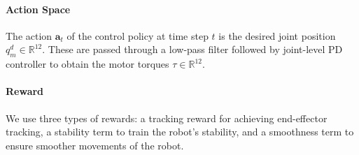  



\paragraph{Action Space}
The action $\mathbf{a}_t$ of the control policy at time step $t$ is the desired joint position $q^d_m \in \mathbb{R}^{12}$. These are passed through a low-pass filter followed by joint-level PD controller to obtain the motor torques $\tau \in \mathbb{R}^{12}$.
\paragraph{Reward}
 We use three types of rewards: a tracking reward for achieving end-effector tracking, a stability term to train the robot's stability, and a smoothness term to ensure smoother movements of the robot.

